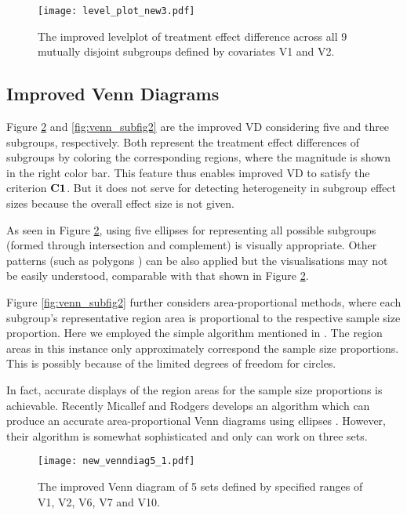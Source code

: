 \documentclass[Afour,sagev,times, doublespace]{sagej}
\begin{document}
{\begin{figure}%
\begin{center}
		\texttt{[image: level\_plot\_new3.pdf]} \\
		\caption{The improved levelplot of treatment effect difference across all 9 mutually disjoint subgroups defined by covariates V1 and V2.}%
        \label{fig:levelplot2}
\end{center}
\end{figure}

\subsection{Improved Venn Diagrams}
Figure \ref{fig:venn_subfig1} and \ref{fig:venn_subfig2} are the improved VD considering five and three subgroups, respectively. Both represent the treatment effect differences of subgroups by coloring the corresponding regions, where the magnitude is shown in the right color bar. This feature thus enables improved VD to satisfy the criterion $\bf C1$. But it does not serve for detecting heterogeneity in subgroup effect sizes because the overall effect size is not given.

As seen in Figure \ref{fig:venn_subfig1}, using five ellipses for representing all possible subgroups (formed through intersection and complement) is visually appropriate. Other patterns (such as polygons \cite{Chow:05b, Rodgers:10}) can be also applied but the visualisations may not be easily understood, comparable with that shown in Figure \ref{fig:venn_subfig1}.

Figure \ref{fig:venn_subfig2} further considers area-proportional methods, where each subgroup's representative region area is proportional to the respective sample size proportion. Here we employed the simple algorithm mentioned in \cite{Micallef:14}. The region areas in this instance only approximately correspond the sample size proportions. This is possibly because of the limited degrees of freedom for circles.

In fact, accurate displays of the region areas for the sample size proportions is achievable. Recently Micallef and Rodgers develops an algorithm which can produce an accurate area-proportional Venn diagrams using ellipses \cite{Micallef:14}. However, their algorithm is somewhat sophisticated and only can work on three sets.


\begin{figure}%
\begin{center}
		\texttt{[image: new\_venndiag5\_1.pdf]} \\
		\caption{The improved Venn diagram of 5 sets defined by specified ranges of V1, V2, V6, V7 and V10.}%
        \label{fig:venn_subfig1}
\end{center}
\end{figure}

}
\end{document}
